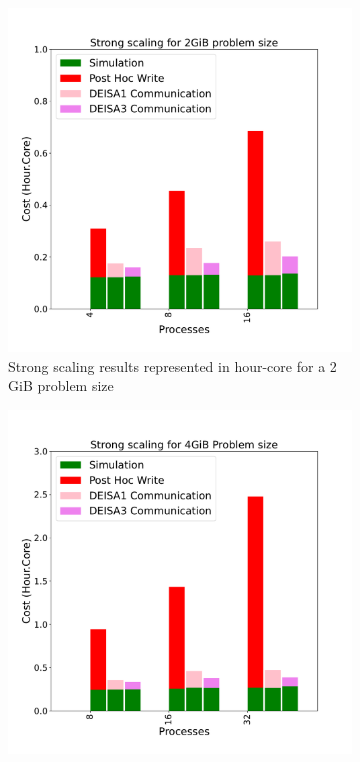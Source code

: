 \begin{figure}[h]
     \centering
     \begin{subfigure}[b]{0.4\textwidth}
         \centering
         \includegraphics[width=\textwidth, height=\textwidth]{figures/D2_1vs3vspost1vspost2.pdf}
         \caption{Strong scaling results represented in hour-core for a 2\,GiB problem size}
         \label{fig:D2}
     \end{subfigure}
     \hfill
     \begin{subfigure}[b]{0.4\textwidth}
         \centering
         \includegraphics[width=\textwidth, height=\textwidth]{figures/D4_1vs3vspost1vspost2.pdf}

\end{subfigure}
\end{figure}

